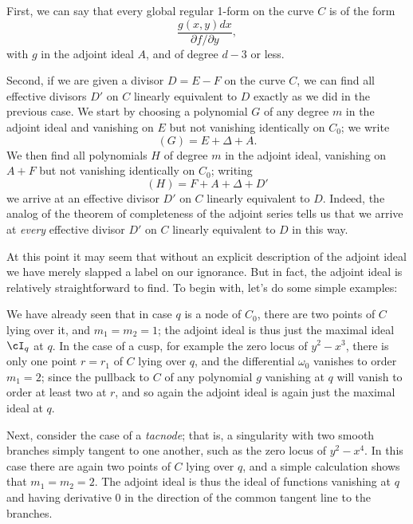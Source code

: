 First, we can say that every global regular 1-form on the curve $C$ is of the form 
$$
\frac{g(x,y) dx}{\partial f/\partial y},
$$
with $g$ in the adjoint ideal $A$, and of degree $d-3$ or less.

Second, if we are given a divisor $D = E - F$ on the curve $C$, we can find all effective divisors $D'$ on $C$ linearly equivalent to $D$ exactly as we did in the previous case. We start by choosing a polynomial $G$ of any degree $m$ in the adjoint ideal and vanishing on $E$ but not vanishing identically on $C_0$; we write
$$
(G) = E + \Delta + A.
$$
We then find all polynomials $H$ of degree $m$ in the adjoint ideal, vanishing on $A + F$ but not vanishing identically on $C_0$; writing
$$
(H) = F + A + \Delta + D'
$$
we arrive at an effective divisor $D'$ on $C$ linearly equivalent to $D$. Indeed,  the analog of the theorem of completeness of the adjoint series tells us that we arrive at \emph{every} effective divisor $D'$ on $C$ linearly equivalent to $D$ in this way.



At this point it may seem that without an explicit description of the adjoint ideal we have merely slapped a label on our ignorance. But in fact, the adjoint ideal is relatively straightforward to find. To begin with, let's do some simple examples:

\begin{example}
We have already seen that in case $q$ is a node of $C_0$, there are two points of $C$ lying over it, and $m_1=m_2=1$; the adjoint ideal is thus just the maximal ideal $\cI_q$ at $q$. In the case of a cusp, for example the zero locus of $y^2-x^3$, there is only one point $r=r_1$ of $C$ lying over $q$, and the differential $\omega_0$ vanishes to order $m_1=2$; since the pullback to $C$ of any polynomial $g$ vanishing at $q$ will vanish to order at least two at $r$, and so again the adjoint ideal is again just the maximal ideal at $q$.
\end{example}


\begin{example}[tacnodes]
Next, consider the case of a \emph{tacnode}; that is, a singularity with two smooth branches simply tangent to one another, such as the zero locus of $y^2-x^4$. In this case there are again two points of $C$ lying over $q$, and a simple calculation shows that $m_1=m_2=2$. The adjoint ideal is thus the ideal of functions vanishing at $q$ and having derivative 0 in the direction of the common tangent line to the branches.
\end{example}



